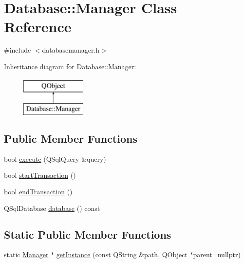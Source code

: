 \hypertarget{classDatabase_1_1Manager}{}\section{Database\+:\+:Manager Class Reference}
\label{classDatabase_1_1Manager}


{\ttfamily \#include $<$databasemanager.\+h$>$}

Inheritance diagram for Database\+:\+:Manager\+:\begin{figure}[H]
\begin{center}
\leavevmode
\includegraphics[height=2.000000cm]{classDatabase_1_1Manager}
\end{center}
\end{figure}
\subsection*{Public Member Functions}
\begin{DoxyCompactItemize}
\item 
bool \mbox{\hyperlink{classDatabase_1_1Manager_a0afd7a0884097a8dcff61b0444f39fb4}{execute}} (Q\+Sql\+Query \&query)
\item 
bool \mbox{\hyperlink{classDatabase_1_1Manager_adbe8be75b47c9770556464859bcc3017}{start\+Transaction}} ()
\item 
bool \mbox{\hyperlink{classDatabase_1_1Manager_a08dc190a448c555f8334bdd60d32b26e}{end\+Transaction}} ()
\item 
Q\+Sql\+Database \mbox{\hyperlink{classDatabase_1_1Manager_aecc5a00737bf6392cccda37a99138d8c}{database}} () const
\end{DoxyCompactItemize}
\subsection*{Static Public Member Functions}
\begin{DoxyCompactItemize}
\item 
static \mbox{\hyperlink{classDatabase_1_1Manager}{Manager}} $\ast$ \mbox{\hyperlink{classDatabase_1_1Manager_a6f8f8635c67e8d6e3ee86410006d22f3}{get\+Instance}} (const Q\+String \&path, Q\+Object $\ast$parent=nullptr)
\end{DoxyCompactItemize}
